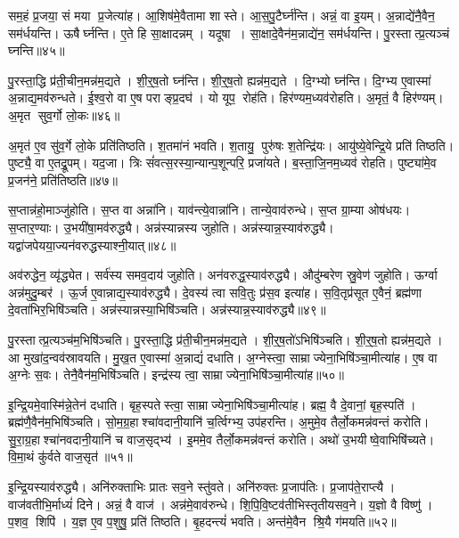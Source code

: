 सम॒हं प्र॒जया॒ सं मया प्र॒जेत्या॑ह।
आ॒शिष॑मे॒वैतामा शास्ते।
आ॒स॒पु॒टैर्घ्न॑न्ति।
अन्नं॒ वा इ॒यम्।
अ॒न्नाद्ये॑नै॒वैन॒ सम॑र्धयन्ति।
ऊषैर्घ्नन्ति।
ए॒ते हि सा॒क्षादन्नम्।
यदूषा।
सा॒क्षादे॒वैन॑म॒न्नाद्ये॑न॒ सम॑र्धयन्ति।
पु॒रस्तात्प्र॒त्यञ्चं घ्नन्ति॥४५॥

पु॒रस्ता॒द्धि प्र॑ती॒चीन॒मन्न॑म॒द्यते।
शी॒र्॒ष॒तो घ्न॑न्ति।
शी॒र्॒ष॒तो ह्यन्न॑म॒द्यते।
दि॒ग्भ्यो घ्न॑न्ति।
दि॒ग्भ्य ए॒वास्मा॑ अ॒न्नाद्य॒मव॑रुन्धते।
ई॒श्व॒रो वा ए॒ष पराङ्प्र॒दघ॑।
यो यूप॒ रोह॑ति।
हिर॑ण्यम॒ध्यव॑रोहति।
अ॒मृतं॒ वै हिर॑ण्यम्।
अ॒मृत सुव॒र्गो लो॒कः॥४६॥

अ॒मृत॑ ए॒व सु॑व॒र्गे लो॒के प्रति॑तिष्ठति।
श॒तमा॑नं भवति।
श॒तायु॒ पुरु॑षः श॒तेन्द्रि॑यः।
आयु॑ष्ये॒वेन्द्रि॒ये प्रति॑ तिष्ठति।
पुष्ट्यै॒ वा ए॒तद्रू॒पम्।
यद॒जा।
त्रिः सं॑वत्स॒रस्या॒न्यान्प॒शून्परि॒ प्रजा॑यते।
ब॒स्ता॒जि॒नम॒ध्यव॑ रोहति।
पुष्ट्या॑मे॒व प्र॒जन॑ने॒ प्रति॑तिष्ठति॥४७॥\anuvakamend[प॒रि॒धा॒पय॑ति गो॒धूमा॑ जुहोति॒ स्वं नैति॑ प्र॒त्यञ्चं घ्नन्ति लो॒को नव॑ च]

स॒प्तान्न॑हो॒माञ्जु॑होति।
स॒प्त वा अन्ना॑नि।
याव॑न्त्ये॒वान्ना॑नि।
तान्ये॒वाव॑रुन्धे।
स॒प्त ग्रा॒म्या ओष॑धयः।
स॒प्तार॒ण्याः।
उ॒भयी॑षा॒मव॑रुद्ध्यै।
अन्न॑स्यान्नस्य जुहोति।
अन्न॑स्यान्न॒स्या\-व॑रुद्ध्यै।
यद्वा॑जपेयया॒ज्यन॑वरुद्धस्याश्नी॒यात्॥४८॥

अव॑रुद्धेन॒ व्यृ॑द्ध्येत।
सर्व॑स्य समव॒दाय॑ जुहोति।
अन॑वरुद्ध॒स्याव॑रुद्ध्यै।
औदु॑म्बरेण स्रु॒वेण॑ जुहोति।
ऊर्ग्वा अन्न॑मुदु॒म्बर॑।
ऊ॒र्ज ए॒वान्नाद्य॒स्याव॑रुद्ध्यै।
दे॒वस्य॑ त्वा सवि॒तुः प्र॑स॒व इत्या॑ह।
स॒वि॒तृप्र॑सूत ए॒वैनं॒ ब्रह्म॑णा दे॒वता॑भिर॒भिषि॑ञ्चति।
अन्न॑स्यान्नस्या॒भिषि॑ञ्चति।
अन्न॑स्यान्न॒स्याव॑रुद्ध्यै॥४९॥

पु॒रस्तात्प्र॒त्यञ्च॑म॒भिषि॑ञ्चति।
पु॒रस्ता॒द्धि प्र॑ती॒चीन॒मन्न॑म॒द्यते।
शी॒र्॒ष॒तो॑ऽभिषि॑ञ्चति।
शी॒र्॒ष॒तो ह्यन्न॑म॒द्यते।
आ मुखा॑द॒न्वव॑स्रावयति।
मु॒ख॒त ए॒वास्मा॑ अ॒न्नाद्यं॑ दधाति।
अ॒ग्नेस्त्वा॒ साम्राज्येना॒भिषि॑ञ्चा॒मीत्या॑ह।
ए॒ष वा अ॒ग्नेः स॒वः।
तेनै॒वैन॑म॒भिषि॑ञ्चति।
इन्द्र॑स्य त्वा॒ साम्राज्येना॒भिषि॑ञ्चा॒मीत्या॑ह॥५०॥

इ॒न्द्रि॒यमे॒वास्मि॑न्ने॒तेन॑ दधाति।
बृह॒स्पतेस्त्वा॒ साम्राज्येना॒भि\-षि॑ञ्चा॒मीत्या॑ह।
ब्रह्म॒ वै दे॒वानां॒ बृह॒स्पति॑।
ब्रह्म॑णै॒वैन॑म॒भि\-षि॑ञ्चति।
सो॒म॒ग्र॒हाश्चा॑वदानी॒यानि॑ च॒र्त्विग्भ्य॒ उप॑हरन्ति।
अ॒मुमे॒व तैर्लो॒कमन्न॑वन्तं करोति।
सु॒रा॒ग्र॒हाश्चा॑नवदानी॒यानि॑ च वाज॒सृद्भ्य॑।
इ॒ममे॒व तैर्लो॒कमन्न॑वन्तं करोति।
अथो॑ उ॒भयीष्वे॒वाभिषि॑च्यते।
वि॒मा॒थं कु॑र्वते वाज॒सृत॑॥५१॥

इ॒न्द्रि॒यस्याव॑रुद्ध्यै।
अनि॑रुक्ताभिः प्रातः सव॒ने स्तु॑वते।
अनि॑रुक्तः प्र॒जाप॑तिः।
प्र॒जाप॑ते॒राप्त्यै।
वाज॑वतीभि॒र्माध्यं॑ दिने।
अन्नं॒ वै वाज॑।
अन्न॑मे॒वाव॑रुन्धे।
शि॒पि॒वि॒ष्ट\-व॑तीभिस्तृतीयसव॒ने।
य॒ज्ञो वै विष्णु॑।
प॒शव॒ शिपि॑।
य॒ज्ञ ए॒व प॒शुषु॒ प्रति॑ तिष्ठति।
बृ॒हदन्त्यं॑ भवति।
अन्त॑मे॒वैन श्रि॒यै ग॑मयति॥५२॥\anuvakamend[अ॒श्नी॒यादन्न॑स्यान्न॒स्याव॑रुद्ध्या॒ इन्द्र॑स्य त्वा॒ साम्राज्येना॒भिषि॑ञ्चा॒मीत्या॑ह वाज॒सृत॒ शिपि॒स्त्रीणि॑ च]

